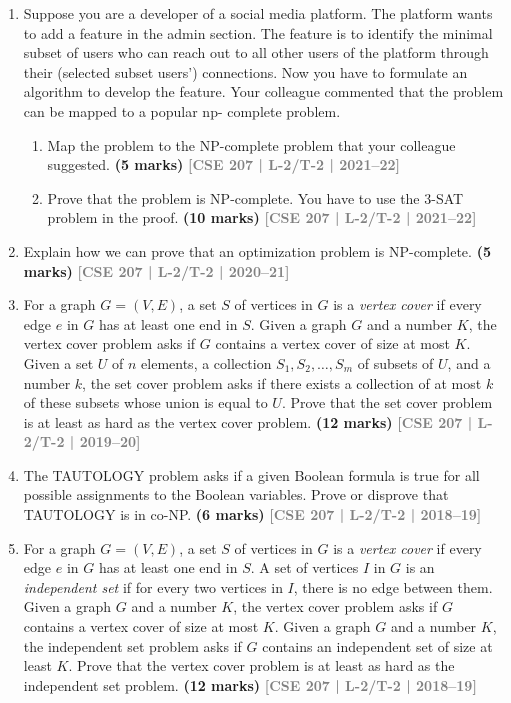 \documentclass[12pt]{article}
\newcommand{\yr}[1]{\hfill\textcolor{gray}{\small\textbf{[#1]}}}
\newcommand{\mk}[1]{\textcolor{orange!70!black}{\small\textbf{(#1 marks)}}}
\begin{document}
\begin{enumerate}
\item Suppose you are a developer of a social media platform. The platform wants to
add a feature in the admin section. The feature is to identify the minimal subset of
users who can reach out to all other users of the platform through their (selected
subset users') connections. Now you have to formulate an algorithm to develop the
feature. Your colleague commented that the problem can be mapped to a popular np-
complete problem.
\begin{enumerate}

\item Map the problem to the NP-complete problem that your colleague suggested.
\mk{5} \yr{CSE 207 | L-2/T-2 | 2021--22}

\item Prove that the problem is NP-complete. You have to use the 3-SAT problem in the proof.
\mk{10} \yr{CSE 207 | L-2/T-2 | 2021--22}
\end{enumerate}


\item Explain how we can prove that an optimization problem is NP-complete.
\mk{5} \yr{CSE 207 | L-2/T-2 | 2020--21}


\item For a graph $G = (V, E)$, a set $S$ of vertices in $G$ is a \textit{vertex cover} if every edge $e$ in $G$ has at least one end in $S$. Given a graph $G$ and a number $K$, the vertex cover problem asks if $G$ contains a vertex cover of size at most $K$. Given a set $U$ of $n$ elements, a collection $S_1, S_2, \ldots, S_m$ of subsets of $U$, and a number $k$, the set cover problem asks if there exists a collection of at most $k$ of these subsets whose union is equal to $U$. Prove that the set cover problem is at least as hard as the vertex cover problem.
\mk{12} \yr{CSE 207 | L-2/T-2 | 2019--20}




\item The TAUTOLOGY problem asks if a given Boolean formula is true for all possible assignments to the Boolean variables. Prove or disprove that TAUTOLOGY is in co-NP.
\mk{6} \yr{CSE 207 | L-2/T-2 | 2018--19}


\item For a graph $G = (V, E)$, a set $S$ of vertices in $G$ is a \textit{vertex cover} if every edge $e$ in $G$ has at least one end in $S$. A set of vertices $I$ in $G$ is an \textit{independent set} if for every two vertices in $I$, there is no edge between them. Given a graph $G$ and a number $K$, the vertex cover problem asks if $G$ contains a vertex cover of size at most $K$. Given a graph $G$ and a number $K$, the independent set problem asks if $G$ contains an independent set of size at least $K$. Prove that the vertex cover problem is at least as hard as the independent set problem.
\mk{12} \yr{CSE 207 | L-2/T-2 | 2018--19}



\end{enumerate}
\end{document}

